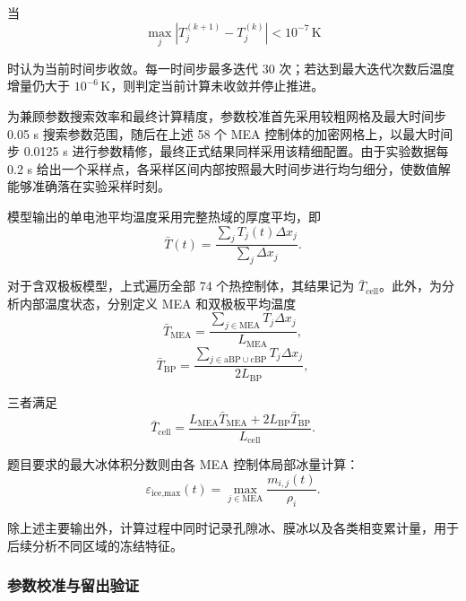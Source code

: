 \documentclass[bwprint]{gmcmthesis}
\numberwithin{equation}{section}
\numberwithin{figure}{section}
\begin{document}
当
\begin{equation}
\max_j \left| T_j^{(k+1)} - T_j^{(k)} \right| < 10^{-7} \, \text{K} \label{eq:src:4-88}
\end{equation}

\noindent 时认为当前时间步收敛。每一时间步最多迭代 30 次；若达到最大迭代次数后温度增量仍大于 \(10^{-6} \, \text{K}\)，则判定当前计算未收敛并停止推进。


为兼顾参数搜索效率和最终计算精度，参数校准首先采用较粗网格及最大时间步 0.05 s 搜索参数范围，随后在上述 58 个 MEA 控制体的加密网格上，以最大时间步 0.0125 s 进行参数精修，最终正式结果同样采用该精细配置。由于实验数据每 0.2 s 给出一个采样点，各采样区间内部按照最大时间步进行均匀细分，使数值解能够准确落在实验采样时刻。

模型输出的单电池平均温度采用完整热域的厚度平均，即
\begin{equation}
\bar{T}(t) = \frac{\sum\limits_j T_j(t) \Delta x_j}{\sum\limits_j \Delta x_j}. \label{eq:src:4-89}
\end{equation}

对于含双极板模型，上式遍历全部 74 个热控制体，其结果记为 \(\bar{T}_{\text{cell}}\)。此外，为分析内部温度状态，分别定义 MEA 和双极板平均温度
\begin{equation}
\bar{T}_{\text{MEA}} = \frac{\sum\limits_{j \in \text{MEA}} T_j \Delta x_j}{L_{\text{MEA}}}, \label{eq:src:4-90}
\end{equation}
\begin{equation}
\bar{T}_{\text{BP}} = \frac{\sum\limits_{j \in \text{aBP} \cup \text{cBP}} T_j \Delta x_j}{2 L_{\text{BP}}}, \label{eq:src:4-91}
\end{equation}

三者满足
\begin{equation}
\bar{T}_{\text{cell}} = \frac{L_{\text{MEA}} \bar{T}_{\text{MEA}} + 2 L_{\text{BP}} \bar{T}_{\text{BP}}}{L_{\text{cell}}}. \label{eq:src:4-92}
\end{equation}

 题目要求的最大冰体积分数则由各 MEA 控制体局部冰量计算：
\begin{equation}
\varepsilon_{\text{ice,max}}(t) = \max_{j \in \text{MEA}} \frac{m_{i,j}(t)}{\rho_i}. \label{eq:src:4-93}
\end{equation}

除上述主要输出外，计算过程中同时记录孔隙冰、膜冰以及各类相变累计量，用于后续分析不同区域的冻结特征。

\subsubsection{参数校准与留出验证}
\end{document}
